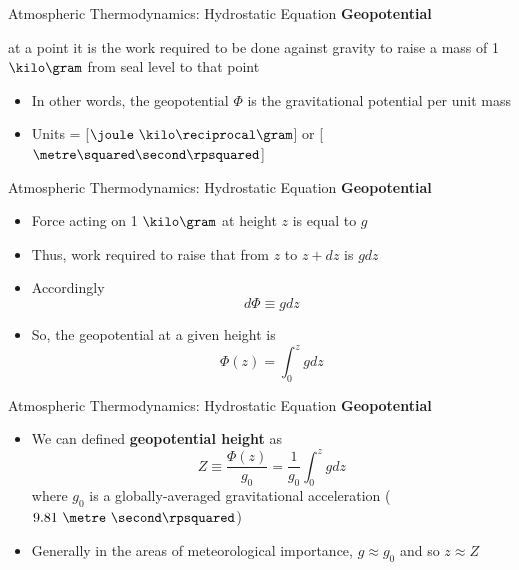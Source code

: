 \begin{frame}{Atmospheric Thermodynamics: Hydrostatic Equation}
\textbf{Geopotential}
\begin{fancydefs}
	at a point it is the work required to be done against gravity to raise a mass of 1 $\kilo\gram$ from seal level to that point
\end{fancydefs}
\begin{itemize}
	\item In other words, the geopotential $\Phi$ is the gravitational potential per unit mass
	\item Units = [$\joule\ \kilo\reciprocal\gram$] or [$\metre\squared \second\rpsquared$]
	\end{itemize}
\end{frame}
\begin{frame}{Atmospheric Thermodynamics: Hydrostatic Equation}
\textbf{Geopotential}
\begin{itemize}
	\item Force acting on 1 $\kilo\gram$ at height $z$ is equal to $g$
	\item Thus, work required to raise that from $z$ to $z+dz$ is $gdz$
	\item Accordingly
	$$d\Phi \equiv gdz$$
	\item So, the geopotential at a given height is
	$$\Phi(z) = \int^{z}_0 gdz$$
	\end{itemize}
\end{frame}
\begin{frame}{Atmospheric Thermodynamics: Hydrostatic Equation}
\textbf{Geopotential}
\begin{itemize}
	\item We can defined \textbf{geopotential height} as
	$$Z \equiv \frac{\Phi(z)}{g_0} = \frac{1}{g_0}\int^{z}_{0} gdz$$
	where $g_0$ is a globally-averaged gravitational acceleration ($9.81\ \metre\ \second\rpsquared$)
	\item Generally in the areas of meteorological importance, $g\approx g_0$ and so $z \approx Z$  
	\end{itemize}
\end{frame}


